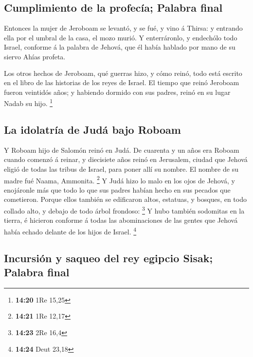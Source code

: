 \hypertarget{cumplimiento-de-la-profecuxeda-palabra-final}{%
\subsection{Cumplimiento de la profecía; Palabra
final}\label{cumplimiento-de-la-profecuxeda-palabra-final}}

 Entonces la mujer de Jeroboam se levantó, y se fué, y vino
á Thirsa: y entrando ella por el umbral de la casa, el mozo murió.
 Y enterráronlo, y endechólo todo Israel, conforme á la
palabra de Jehová, que él había hablado por mano de su siervo Ahías
profeta.

 Los otros hechos de Jeroboam, qué guerras hizo, y cómo
reinó, todo está escrito en el libro de las historias de los reyes de
Israel.  El tiempo que reinó Jeroboam fueron veintidós
años; y habiendo dormido con sus padres, reinó en su lugar Nadab su
hijo. \footnote{\textbf{14:20} 1Re 15,25}

\hypertarget{la-idolatruxeda-de-juduxe1-bajo-roboam}{%
\subsection{La idolatría de Judá bajo
Roboam}\label{la-idolatruxeda-de-juduxe1-bajo-roboam}}

 Y Roboam hijo de Salomón reinó en Judá. De cuarenta y un
años era Roboam cuando comenzó á reinar, y diecisiete años reinó en
Jerusalem, ciudad que Jehová eligió de todas las tribus de Israel, para
poner allí su nombre. El nombre de su madre fué Naama, Ammonita.
\footnote{\textbf{14:21} 1Re 12,17}  Y Judá hizo lo malo en
los ojos de Jehová, y enojáronle más que todo lo que sus padres habían
hecho en sus pecados que cometieron.  Porque ellos también
se edificaron altos, estatuas, y bosques, en todo collado alto, y debajo
de todo árbol frondoso: \footnote{\textbf{14:23} 2Re 16,4} 
Y hubo también sodomitas en la tierra, é hicieron conforme á todas las
abominaciones de las gentes que Jehová había echado delante de los hijos
de Israel. \footnote{\textbf{14:24} Deut 23,18}

\hypertarget{incursiuxf3n-y-saqueo-del-rey-egipcio-sisak-palabra-final}{%
\subsection{Incursión y saqueo del rey egipcio Sisak; Palabra
final}\label{incursiuxf3n-y-saqueo-del-rey-egipcio-sisak-palabra-final}}

